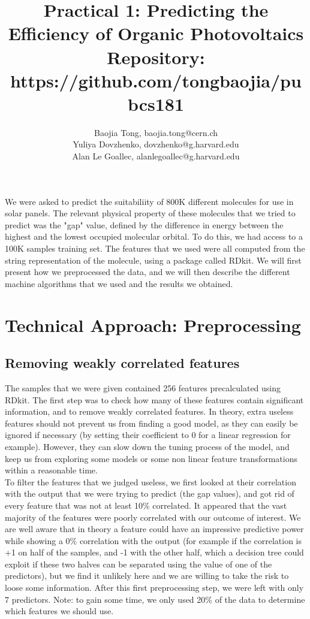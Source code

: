 \documentclass[11pt]{article}
\title{Practical 1: Predicting the Efficiency of Organic Photovoltaics\\Repository: https://github.com/tongbaojia/pubcs181}
\author{Baojia Tong, baojia.tong@cern.ch \\ Yuliya Dovzhenko, dovzhenko@g.harvard.edu \\ Alan Le Goallec, alanlegoallec@g.harvard.edu}
\begin{document}
\maketitle{}


\noindent We were asked to predict the suitabiliity of 800K different molecules for use in solar panels. The relevant physical property of these molecules that we tried to predict
was the "gap" value, defined by the difference in energy between the highest and the lowest occupied molecular orbital.
To do this, we had access to a 100K samples training set. The features that we used were all computed from the 
string representation of the molecule, using a package called RDkit.
We will first present how we preprocessed the data, and we will then describe the different machine algorithms that we
used and the results we obtained.

\section{Technical Approach: Preprocessing}

  \subsection{Removing weakly correlated features}
    The samples that we were given contained 256 features precalculated using RDkit.
    The first step was to check how many of these features contain significant information, and to remove weakly correlated features.
    In theory, extra useless features should not prevent us from finding a good model, as they can easily
    be ignored if necessary (by setting their coefficient to 0 for a linear regression for example). However,
    they can slow down the tuning process of the model, and keep us from exploring some models or some non linear
    feature transformations within a reasonable time. \\
    To filter the features that we judged useless, we first looked at their correlation with the output that we were
    trying to predict (the gap values), and got rid of every feature that was not at least 10\% correlated.
    It appeared that the vast majority of the features were poorly correlated with our outcome of interest.
    We are well aware that in theory a feature could have an impressive predictive power while showing a 0\% correlation with
    the output (for example if the correlation is +1 on half of the samples, and -1 with the other half, which a decision tree could exploit
    if these two halves can be separated using the value of one of the predictors),
    but we find it unlikely here and we are willing to take the risk to loose some information.
    After this first preprocessing step, we were left with only 7 predictors.
    Note: to gain some time, we only used 20\% of the data to determine which features we should use.
\end{document}
